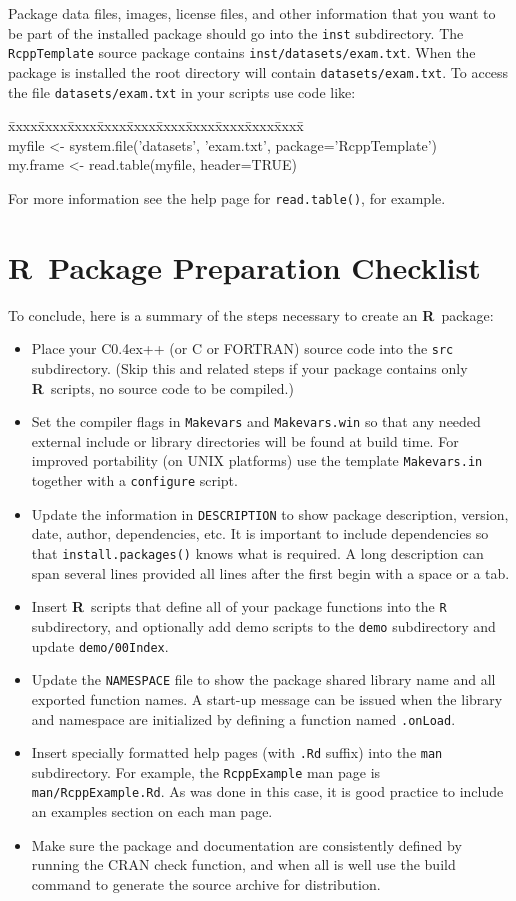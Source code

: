 \documentclass{article}
\newenvironment{program}{\ttfamily\begin{tabbing}
\=xxxx\=xxxx\=xxxx\=xxxx\=xxxx\=xxxx\=xxxx\=xxxx\=xxxx\=xxxx\= \+ \kill \\
}{\end{tabbing}}
\def\C++{C{\raise 0.4ex\hbox{\tiny ++}}}
\newcommand{\R}{{\bf R}}
\begin{document}
Package data files, images, license files, and other information that
you want to be part of the installed package should go into the
{\tt inst} subdirectory. The {\tt RcppTemplate} source package contains
{\tt inst/datasets/exam.txt}. When the package is installed the root
directory will contain {\tt datasets/exam.txt}.
To access the file {\tt datasets/exam.txt} in your scripts use code like:
\begin{program}
  myfile <- system.file('datasets', 'exam.txt', package='RcppTemplate')\\
  my.frame <- read.table(myfile, header=TRUE)
\end{program}
For more information see the help page for {\tt read.table()}, for example.

\section{\R\ Package Preparation Checklist}

To conclude, here is a summary of the steps necessary to create an \R\ package:
\begin{itemize}
  \item Place your \C++ (or C or FORTRAN) source code into the {\tt src}
    subdirectory. (Skip this and related steps if your package
    contains only \R\ scripts, no source code to be compiled.)
  \item Set the compiler flags in {\tt Makevars} and {\tt Makevars.win} so
    that any needed external include or library directories will be found
    at build time. For improved portability (on UNIX platforms) use the
    template {\tt Makevars.in} together with a {\tt configure} script.
  \item Update the information in {\tt DESCRIPTION} to show package
    description, version, date, author, dependencies, etc. It is important to
    include dependencies so that {\tt install.packages()} knows what is
    required. A long description can span several lines provided all lines
    after the first begin with a space or a tab.
  \item Insert \R\ scripts that define all of your package functions
    into the {\tt R} subdirectory, and optionally add demo scripts to
    the {\tt demo} subdirectory and update {\tt demo/00Index}.
  \item Update the {\tt NAMESPACE} file to show the package
    shared library name and all exported function names. A start-up message can
    be issued when the library and namespace are initialized by defining
    a function named {\tt .onLoad}.
  \item Insert specially formatted help pages (with {\tt .Rd} suffix) into
    the {\tt man} subdirectory. For example, the {\tt RcppExample} man page is
    {\tt man/RcppExample.Rd}. As was done in this case, it is good practice
    to include an examples section on each man page.
  \item Make sure the package and documentation are consistently defined by
    running the CRAN check function, and when all is well use the build
    command to generate the source archive for distribution.
\end{itemize}
\end{document}
